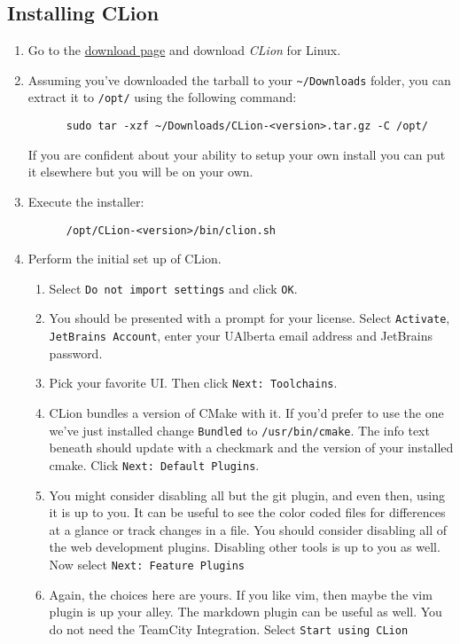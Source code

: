 \documentclass[../setup.tex]{subfiles}
\begin{document}
\subsection{Installing CLion}
\begin{enumerate}
  \item
    Go to the \href{https://www.jetbrains.com/clion/download/\#section=linux} {download page} and
    download \textit{CLion} for Linux.
  \item
    Assuming you've downloaded the tarball to your \lstinline{~/Downloads} folder, you can extract
    it to \lstinline{/opt/} using the following command:
    \begin{lstlisting}
      sudo tar -xzf ~/Downloads/CLion-<version>.tar.gz -C /opt/
    \end{lstlisting}
    If you are confident about your ability to setup your own install you can put it
    elsewhere but you will be on your own.
  \item
    Execute the installer:
    \begin{lstlisting}
      /opt/CLion-<version>/bin/clion.sh
    \end{lstlisting}
  \item
    Perform the initial set up of CLion.
    \begin{enumerate}
      \item
        Select \texttt{Do not import settings} and click \texttt{OK}.
      \item
        You should be presented with a prompt for your license. Select \texttt{Activate},
        \texttt{JetBrains Account}, enter your UAlberta email address and JetBrains password.
      \item
        Pick your favorite UI. Then click \texttt{Next: Toolchains}.
      \item
        CLion bundles a version of CMake with it. If you'd prefer to use the one we've just
        installed change \texttt{Bundled} to \lstinline{/usr/bin/cmake}. The info text beneath
        should update with a checkmark and the version of your installed cmake. Click
        \texttt{Next: Default Plugins}.
      \item
        You might consider disabling all but the git plugin, and even then, using it is up to you.
        It can be useful to see the color coded files for differences at a glance or track changes
        in a file. You should consider disabling all of the web development plugins. Disabling
        other tools is up to you as well. Now select \texttt{Next: Feature Plugins}
      \item
        Again, the choices here are yours. If you like vim, then maybe the vim plugin is up your
        alley. The markdown plugin can be useful as well. You do not need the TeamCity Integration.
        Select \texttt{Start using CLion}
    \end{enumerate}
\end{enumerate}
\end{document}
